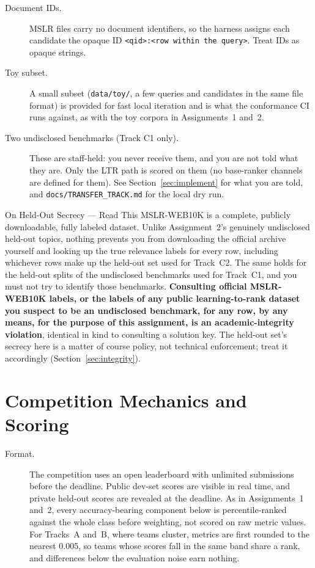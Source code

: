 \documentclass[10pt]{article}
\begin{document}
\begin{description}
  \item[Document IDs.]
  MSLR files carry no document identifiers, so the harness assigns each candidate the opaque ID \texttt{<qid>:<row within the query>}. Treat IDs as opaque strings.

  \item[Toy subset.]
  A small subset (\texttt{data/toy/}, a few queries and candidates in the same file format) is provided for fast local iteration and is what the conformance CI runs against, as with the toy corpora in Assignments~1 and~2.

  \item[Two undisclosed benchmarks (Track C1 only).]
  These are staff-held: you never receive them, and you are not told what they are. Only the LTR path is scored on them (no base-ranker channels are defined for them). See Section~\ref{sec:implement} for what you are told, and \texttt{docs/TRANSFER\_TRACK.md} for the local dry run.
\end{description}

\begin{mybox}{On Held-Out Secrecy --- Read This}
MSLR-WEB10K is a complete, publicly downloadable, fully labeled dataset. Unlike Assignment~2's genuinely undisclosed held-out topics, nothing prevents you from downloading the official archive yourself and looking up the true relevance labels for every row, including whichever rows make up the held-out set used for Track~C2. The same holds for the held-out splits of the undisclosed benchmarks used for Track~C1, and you must not try to identify those benchmarks. \textbf{Consulting official MSLR-WEB10K labels, or the labels of any public learning-to-rank dataset you suspect to be an undisclosed benchmark, for any row, by any means, for the purpose of this assignment, is an academic-integrity violation}, identical in kind to consulting a solution key. The held-out set's secrecy here is a matter of course policy, not technical enforcement; treat it accordingly (Section~\ref{sec:integrity}).
\end{mybox}

\section{Competition Mechanics and Scoring}
\label{sec:scoring}

\begin{description}
  \item[Format.]
  The competition uses an open leaderboard with unlimited submissions before the deadline. Public dev-set scores are visible in real time, and private held-out scores are revealed at the deadline. As in Assignments~1 and~2, every accuracy-bearing component below is percentile-ranked against the whole class before weighting, not scored on raw metric values. 
   For Tracks~A and~B, where teams cluster, metrics are first rounded to the nearest 0.005, so teams whose scores fall in the same band share a rank, and differences below the evaluation noise earn nothing.
\end{description}
\end{document}

